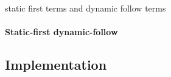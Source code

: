 static first terms and dynamic follow terms

\paragraph{Static-first dynamic-follow}



\subsection{Implementation}


